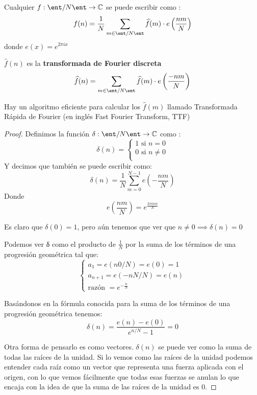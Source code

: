 \begin{theorem}

	Cualquier $f : \ent/N\ent \rightarrow \mathbb{C}$ se puede escribir como :
	$$f(n) = \frac{1}{N}\sum_{m\in \ent/N\ent}\widehat{f}(m)\cdot e\left(\frac{nm}{N}\right)$$
	donde $e(x) = e^{2\pi ix}$

	$\widehat{f}(n)$ es la \textbf{transformada de Fourier discreta}
	$$\widehat{f}(n) = \sum_{m\in \ent/N\ent}\widehat{f}(m)\cdot e\left(\frac{-nm}{N}\right)$$

\end{theorem}
\obs Hay un algoritmo eficiente para calcular los $\widehat{f}(m)$ llamado Transformada Rápida de Fourier (en inglés Fast Fourier Transform, TTF)

\begin{proof}
	Definimos la función $\delta : \ent/N\ent \rightarrow \mathbb{C}$ como :
	$$\delta (n) = \begin{cases}
	1 \text{ si } n=0\\
	0 \text{ si } n\neq 0 \\
	\end{cases}$$
	Y decimos que también se puede escribir como:
	$$\delta (n) = \frac{1}{N} \sum_{m = 0}^{N-1} e\left(-\frac{nm}{N}\right)$$
	Donde
	\[e\left(\frac{nm}{N}\right) = e^{\frac{2\pi inm}{N}}\]

	Es claro que $\delta(0) = 1$, pero aún tenemos que ver que $n\neq 0 \implies \delta (n) = 0$

	Podemos ver δ como el producto de $\frac{1}{N}$ por la suma de los términos de una progresión geométrica tal que:
	\[\begin{cases}
	a_1 = e(n0/N)=e(0)=1\\
	a_{n+1} = e(-nN/N)=e(n)\\
	\text{razón } = e^{-\frac{n}{N}}
	\end{cases}\]

	Basándonos en la fórmula conocida para la suma de los términos de una progresión geométrica tenemos:
	$$\delta (n) =\frac{e(n) - e(0)}{e^{n/N} - 1} = 0$$

	Otra forma de pensarlo es como vectores. $\delta(n)$ se puede ver como la suma de todas las raíces de la unidad. Si lo vemos como las raíces de la unidad podemos entender cada raíz como un vector que representa una fuerza aplicada con el origen, con lo que vemos fácilmente que todas esas fuerzas se anulan lo que encaja con la idea de que la suma de las raíces de la unidad es 0.


\end{proof}

